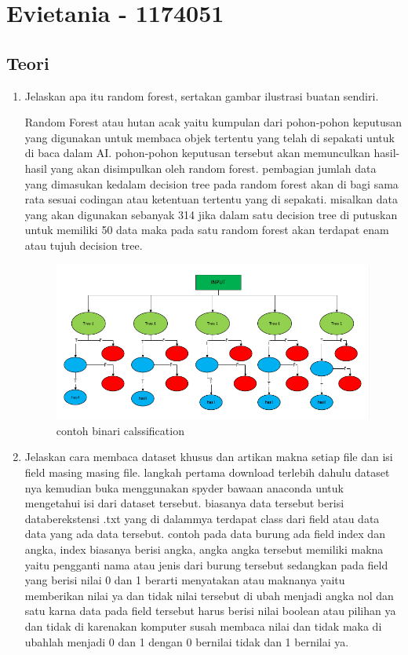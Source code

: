 \section{Evietania - 1174051}

\subsection{Teori}
\begin{enumerate}
\item Jelaskan apa itu random forest, sertakan gambar ilustrasi buatan sendiri.\par
Random Forest atau hutan acak yaitu kumpulan dari pohon-pohon keputusan yang digunakan untuk membaca objek tertentu yang telah di sepakati untuk di baca dalam AI. pohon-pohon keputusan tersebut akan memunculkan hasil-hasil yang akan disimpulkan oleh random forest. pembagian jumlah data yang dimasukan kedalam decision tree pada random forest akan di bagi sama rata sesuai codingan atau ketentuan tertentu yang di sepakati. misalkan data yang akan digunakan sebanyak 314 jika dalam satu decision tree di putuskan untuk memiliki 50 data maka pada satu random forest akan terdapat enam atau tujuh decision tree.
\begin{figure}[ht]
\centering
\includegraphics[scale=0.2]{figures/1174051/3/1.png}
\caption{contoh binari calssification}
\label{contoh}
\end{figure}

\item Jelaskan cara membaca dataset khusus dan artikan makna setiap file dan isi field masing masing file.
langkah pertama download terlebih dahulu dataset nya kemudian buka menggunakan spyder bawaan anaconda untuk mengetahui isi dari dataset tersebut. biasanya data tersebut berisi databerekstensi .txt yang di dalammya terdapat class dari field atau data data yang ada data tersebut. contoh pada data burung ada field index dan angka, index biasanya berisi angka, angka angka tersebut memiliki makna yaitu pengganti nama atau jenis dari burung tersebut sedangkan pada field yang berisi nilai 0 dan 1 berarti menyatakan atau maknanya yaitu memberikan nilai ya dan tidak nilai tersebut di ubah menjadi angka nol dan satu karna data pada field tersebut harus berisi nilai boolean atau pilihan ya dan tidak di karenakan komputer susah membaca nilai dan tidak maka di ubahlah menjadi 0 dan 1 dengan 0 bernilai tidak dan 1 bernilai ya.


\end{enumerate}
